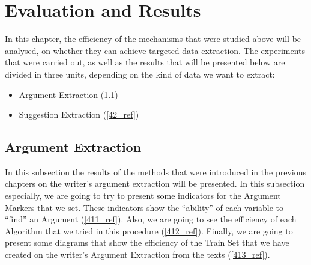 \chapter{Evaluation and Results}
In this chapter, the efficiency of the mechanisms that were studied above will be analysed, on whether they can achieve targeted data extraction. The experiments that were carried out, as well as the results that will be presented below are divided in three units, depending on the kind of data we want to extract:\\
\begin{itemize}

	\item Argument Extraction (\ref{41_ref})
	\item Suggestion Extraction (\ref{42_ref})


\end{itemize}
\section{Argument Extraction}\label{41_ref}
In this subsection the results of the methods that were introduced in the previous chapters on the writer's argument extraction will be presented. In this subsection especially, we are going to try to present some indicators for the Argument Markers that we set. These indicators show the ``ability'' of each variable to ``find'' an Argument (\ref{411_ref}). Also, we are going to see the efficiency of each Algorithm that we tried in this procedure (\ref{412_ref}). Finally, we are going to present some diagrams that show the efficiency of the Train Set that we have created on the writer's Argument Extraction from the texts (\ref{413_ref}).

